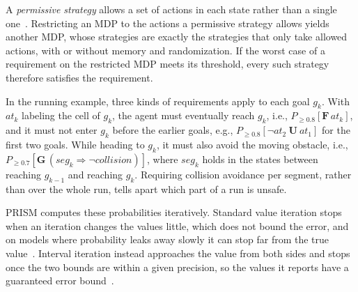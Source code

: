A \textit{permissive strategy} allows a set of actions in each state rather than a single one~\cite{TODO-Draeger2015-permissive}.
Restricting an MDP to the actions a permissive strategy allows yields another MDP, whose strategies are exactly the strategies that only take allowed actions, with or without memory and randomization.
If the worst case of a requirement on the restricted MDP meets its threshold, every such strategy therefore satisfies the requirement.

In the running example, three kinds of requirements apply to each goal $g_k$.
With $\mathit{at}_k$ labeling the cell of $g_k$, the agent must eventually reach $g_k$, i.e., $P_{\geq 0.8}[\mathbf{F}\, \mathit{at}_k]$, and it must not enter $g_k$ before the earlier goals, e.g., $P_{\geq 0.8}[\neg \mathit{at}_2\ \mathbf{U}\ \mathit{at}_1]$ for the first two goals.
While heading to $g_k$, it must also avoid the moving obstacle, i.e., $P_{\geq 0.7}[\mathbf{G}\,(\mathit{seg}_k \Rightarrow \neg \mathit{collision})]$, where $\mathit{seg}_k$ holds in the states between reaching $g_{k-1}$ and reaching $g_k$.
Requiring collision avoidance per segment, rather than over the whole run, tells apart which part of a run is unsafe.

PRISM computes these probabilities iteratively.
Standard value iteration stops when an iteration changes the values little, which does not bound the error, and on models where probability leaks away slowly it can stop far from the true value~\cite{TODO-Haddad2018-interval-iteration}.
Interval iteration instead approaches the value from both sides and stops once the two bounds are within a given precision, so the values it reports have a guaranteed error bound~\cite{TODO-Haddad2018-interval-iteration,TODO-Baier2017-interval-iteration}.
